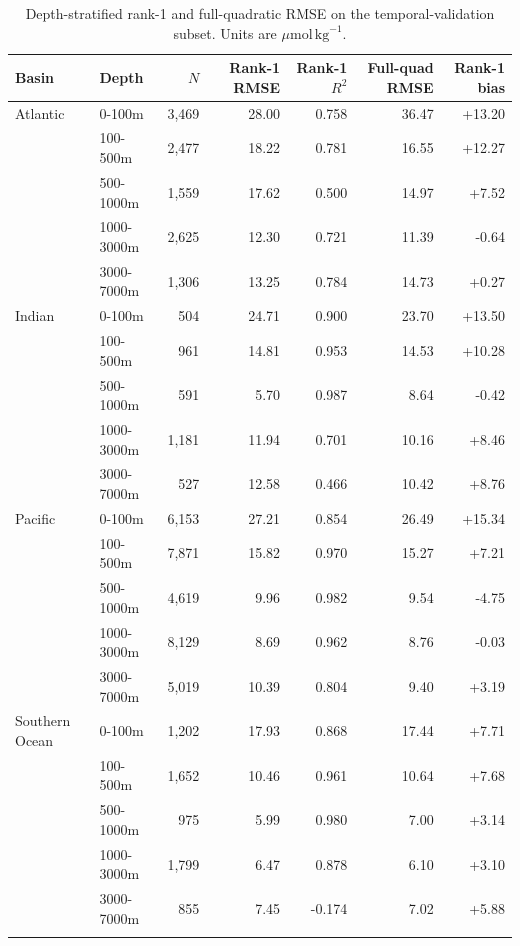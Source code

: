 \begin{table}[htbp]
\centering
\caption{Depth-stratified rank-1 and full-quadratic RMSE on the temporal-validation subset. Units are $\mu\mathrm{mol}\,\mathrm{kg}^{-1}$.}
\label{tab:depth}
\small
\begin{tabular}{llrrrrr}
\toprule
Basin & Depth & $N$ & Rank-1 RMSE & Rank-1 $R^2$ & Full-quad RMSE & Rank-1 bias \\
\midrule
Atlantic & 0-100m & 3,469 & 28.00 & 0.758 & 36.47 & +13.20 \\
 & 100-500m & 2,477 & 18.22 & 0.781 & 16.55 & +12.27 \\
 & 500-1000m & 1,559 & 17.62 & 0.500 & 14.97 & +7.52 \\
 & 1000-3000m & 2,625 & 12.30 & 0.721 & 11.39 & -0.64 \\
 & 3000-7000m & 1,306 & 13.25 & 0.784 & 14.73 & +0.27 \\
\addlinespace
Indian & 0-100m & 504 & 24.71 & 0.900 & 23.70 & +13.50 \\
 & 100-500m & 961 & 14.81 & 0.953 & 14.53 & +10.28 \\
 & 500-1000m & 591 & 5.70 & 0.987 & 8.64 & -0.42 \\
 & 1000-3000m & 1,181 & 11.94 & 0.701 & 10.16 & +8.46 \\
 & 3000-7000m & 527 & 12.58 & 0.466 & 10.42 & +8.76 \\
\addlinespace
Pacific & 0-100m & 6,153 & 27.21 & 0.854 & 26.49 & +15.34 \\
 & 100-500m & 7,871 & 15.82 & 0.970 & 15.27 & +7.21 \\
 & 500-1000m & 4,619 & 9.96 & 0.982 & 9.54 & -4.75 \\
 & 1000-3000m & 8,129 & 8.69 & 0.962 & 8.76 & -0.03 \\
 & 3000-7000m & 5,019 & 10.39 & 0.804 & 9.40 & +3.19 \\
\addlinespace
Southern Ocean & 0-100m & 1,202 & 17.93 & 0.868 & 17.44 & +7.71 \\
 & 100-500m & 1,652 & 10.46 & 0.961 & 10.64 & +7.68 \\
 & 500-1000m & 975 & 5.99 & 0.980 & 7.00 & +3.14 \\
 & 1000-3000m & 1,799 & 6.47 & 0.878 & 6.10 & +3.10 \\
 & 3000-7000m & 855 & 7.45 & -0.174 & 7.02 & +5.88 \\
\addlinespace
\bottomrule
\end{tabular}
\end{table}
